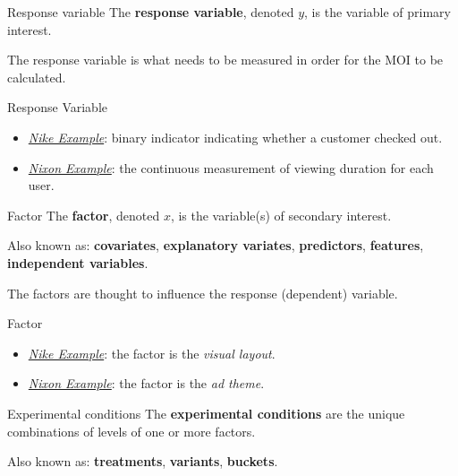 \begin{Definition}{Response variable}{}
    The \textbf{response variable}, denoted $ y $, is the variable of primary interest.
\end{Definition}
\begin{Remark}{}{}
    The response variable is what needs to be measured in order for the MOI to be calculated.
\end{Remark}
\begin{Example}{Response Variable}{}
    \begin{itemize}
        \item \emph{\hyperref[ex:nike_ex]{Nike Example}}: binary indicator indicating
              whether a customer checked out.
        \item \emph{\hyperref[ex:nixon_ex]{Nixon Example}}: the continuous measurement
              of viewing duration for each user.
    \end{itemize}
\end{Example}
\begin{Definition}{Factor}{}
    The \textbf{factor}, denoted $ x $, is the variable(s) of secondary interest.

    \vspace{2mm}

    Also known as: \textbf{covariates}, \textbf{explanatory variates}, \textbf{predictors},
    \textbf{features}, \textbf{independent variables}.
\end{Definition}
\begin{Remark}{}{}
    The factors are thought to influence the response (dependent) variable.
\end{Remark}
\begin{Example}{Factor}{}
    \begin{itemize}
        \item \emph{\hyperref[ex:nike_ex]{Nike Example}}: the factor is the \emph{visual layout}.
        \item \emph{\hyperref[ex:nixon_ex]{Nixon Example}}: the factor is the \emph{ad theme}.
    \end{itemize}
\end{Example}
\begin{Definition}{Experimental conditions}{}
    The \textbf{experimental conditions} are the unique combinations of levels of one or more
    factors.

    \vspace{2mm}

    Also known as: \textbf{treatments}, \textbf{variants}, \textbf{buckets}.
\end{Definition}
